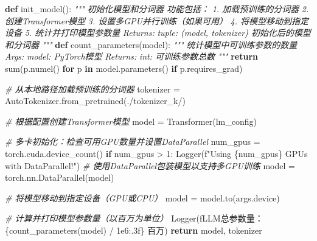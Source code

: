 \documentclass[
]{article}
\newenvironment{Shaded}{}{}
\newcommand{\BuiltInTok}[1]{\textcolor[rgb]{0.00,0.50,0.00}{#1}}
\newcommand{\CommentTok}[1]{\textcolor[rgb]{0.38,0.63,0.69}{\textit{#1}}}
\newcommand{\ControlFlowTok}[1]{\textcolor[rgb]{0.00,0.44,0.13}{\textbf{#1}}}
\newcommand{\DecValTok}[1]{\textcolor[rgb]{0.25,0.63,0.44}{#1}}
\newcommand{\FloatTok}[1]{\textcolor[rgb]{0.25,0.63,0.44}{#1}}
\newcommand{\KeywordTok}[1]{\textcolor[rgb]{0.00,0.44,0.13}{\textbf{#1}}}
\newcommand{\NormalTok}[1]{#1}
\newcommand{\OperatorTok}[1]{\textcolor[rgb]{0.40,0.40,0.40}{#1}}
\newcommand{\SpecialCharTok}[1]{\textcolor[rgb]{0.25,0.44,0.63}{#1}}
\newcommand{\SpecialStringTok}[1]{\textcolor[rgb]{0.73,0.40,0.53}{#1}}
\newcommand{\StringTok}[1]{\textcolor[rgb]{0.25,0.44,0.63}{#1}}
\begin{document}
\begin{Shaded}
\begin{Highlighting}[]
\KeywordTok{def}\NormalTok{ init\_model():}
    \CommentTok{"""}
\CommentTok{    初始化模型和分词器}
\CommentTok{    }
\CommentTok{    功能包括：}
\CommentTok{    1. 加载预训练的分词器}
\CommentTok{    2. 创建Transformer模型}
\CommentTok{    3. 设置多GPU并行训练（如果可用）}
\CommentTok{    4. 将模型移动到指定设备}
\CommentTok{    5. 统计并打印模型参数量}
\CommentTok{    }
\CommentTok{    Returns:}
\CommentTok{        tuple: (model, tokenizer) 初始化后的模型和分词器}
\CommentTok{    """}
    \KeywordTok{def}\NormalTok{ count\_parameters(model):}
        \CommentTok{"""}
\CommentTok{        统计模型中可训练参数的数量}
\CommentTok{        }
\CommentTok{        Args:}
\CommentTok{            model: PyTorch模型}
\CommentTok{            }
\CommentTok{        Returns:}
\CommentTok{            int: 可训练参数总数}
\CommentTok{        """}
        \ControlFlowTok{return} \BuiltInTok{sum}\NormalTok{(p.numel() }\ControlFlowTok{for}\NormalTok{ p }\KeywordTok{in}\NormalTok{ model.parameters() }\ControlFlowTok{if}\NormalTok{ p.requires\_grad)}

    \CommentTok{\# 从本地路径加载预训练的分词器}
\NormalTok{    tokenizer }\OperatorTok{=}\NormalTok{ AutoTokenizer.from\_pretrained(}\StringTok{\textquotesingle{}./tokenizer\_k/\textquotesingle{}}\NormalTok{)}

    \CommentTok{\# 根据配置创建Transformer模型}
\NormalTok{    model }\OperatorTok{=}\NormalTok{ Transformer(lm\_config)}
    
    \CommentTok{\# 多卡初始化：检查可用GPU数量并设置DataParallel}
\NormalTok{    num\_gpus }\OperatorTok{=}\NormalTok{ torch.cuda.device\_count()}
    \ControlFlowTok{if}\NormalTok{ num\_gpus }\OperatorTok{\textgreater{}} \DecValTok{1}\NormalTok{:}
\NormalTok{        Logger(}\SpecialStringTok{f"Using }\SpecialCharTok{\{}\NormalTok{num\_gpus}\SpecialCharTok{\}}\SpecialStringTok{ GPUs with DataParallel!"}\NormalTok{)}
        \CommentTok{\# 使用DataParallel包装模型以支持多GPU训练}
\NormalTok{        model }\OperatorTok{=}\NormalTok{ torch.nn.DataParallel(model)}
    
    \CommentTok{\# 将模型移动到指定设备（GPU或CPU）}
\NormalTok{    model }\OperatorTok{=}\NormalTok{ model.to(args.device)}
    
    \CommentTok{\# 计算并打印模型参数量（以百万为单位）}
\NormalTok{    Logger(}\SpecialStringTok{f\textquotesingle{}LLM总参数量：}\SpecialCharTok{\{}\NormalTok{count\_parameters(model) }\OperatorTok{/} \FloatTok{1e6}\SpecialCharTok{:.3f\}}\SpecialStringTok{ 百万\textquotesingle{}}\NormalTok{)}
    \ControlFlowTok{return}\NormalTok{ model, tokenizer}



\end{Highlighting}
\end{Shaded}
\end{document}
